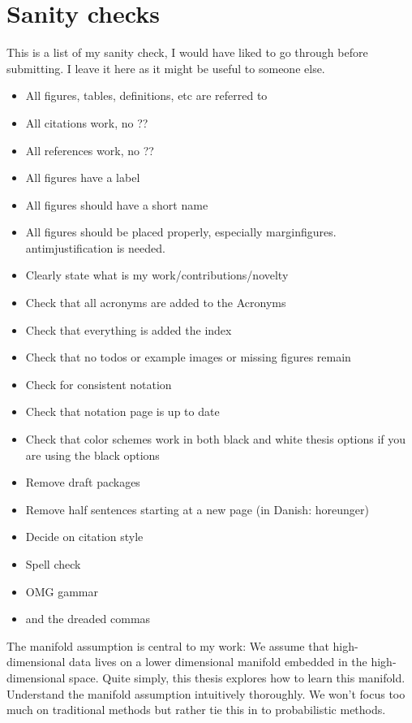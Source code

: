 \section{Sanity checks}
This is a list of my sanity check, I would have liked to go through before submitting. I leave it here as it might be useful to someone else.

\begin{itemize}
\item All figures, tables, definitions, etc are referred to
\item All citations work, no ??
\item All references work, no ??
\item All figures have a label
\item All figures should have a short name
\item All figures should be placed properly, especially marginfigures. antimjustification is needed.
\item Clearly state what is my work/contributions/novelty
\item Check that all acronyms are added to the Acronyms
\item Check that everything is added the index
\item Check that no todos or example images or missing figures remain
\item Check for consistent notation
\item Check that notation page is up to date
\item Check that color schemes work in both black and white thesis options if you are using the black options
\item Remove draft packages
\item Remove half sentences starting at a new page (in Danish: horeunger)
\item Decide on citation style
\item Spell check
\item OMG gammar
\item and the dreaded commas
\end{itemize}





\clearpage


\label{chap:examples}

The manifold assumption is central to my work: We assume that high-dimensional data lives on a lower dimensional manifold embedded in the high-dimensional space. Quite simply, this thesis explores how to learn this manifold. Understand the manifold assumption intuitively thoroughly. We won't focus too much on traditional methods but rather tie this in to probabilistic methods.

